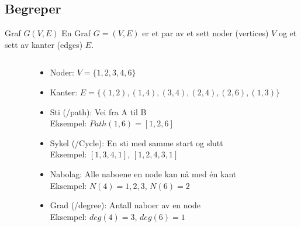 \subsection*{Begreper}
\begin{frame}
    \begin{block}{Graf $G(V,E)$}
    En Graf $G = (V, E)$ er et par av et sett noder (vertices) $V$ og et sett av kanter (edges) $E$.
    \end{block}
    \pause

\begin{columns}
    \begin{column}{0.28\textwidth}
 \end{column}
 \pause
    \begin{column}{0.68\textwidth}
\begin{itemize}[<+->]
    \item Noder: $V=\{1,2,3,4,6\}$ \pause
    \item Kanter: $E=\{(1,2), (1,4), (3,4), (2,4), (2,6), (1,3)\}$\pause
    \item Sti (/path): Vei fra A til B\\
    Eksempel: $Path(1,6)=[1,2,6]$\pause
    \item Sykel (/Cycle): En sti med samme start og slutt\\
    Eksempel: $[1,3,4,1]$, $[1,2,4,3,1]$\pause
    \item Nabolag: Alle naboene en node kan nå med én kant\\
    Eksempel: $N(4)={1,2,3}$, $N(6)=2$\pause
    \item Grad (/degree): Antall naboer av en node\\
    Eksempel: $deg(4)=3$, $deg(6)=1$
\end{itemize}
 \end{column}
\end{columns}
\end{frame}

